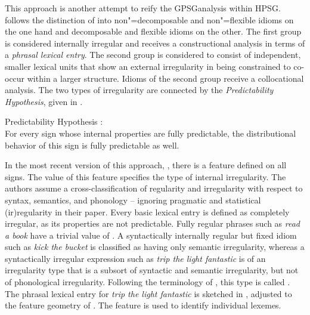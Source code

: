 \documentclass[output=paper,biblatex,babelshorthands,newtxmath,draftmode,colorlinks,citecolor=brown]{langscibook}
\begin{document}
This approach is another attempt to reify the GPSG\indexgpsg analysis
within HPSG.  \citet{Sailer2000a} follows the distinction of \citet{NSW94a} into non"=decomposable
and non"=flexible idioms on the one hand and decomposable and flexible idioms on the other. The
first group is considered internally irregular and receives a constructional analysis in terms of a
\emph{phrasal lexical entry}. The second group is considered to consist of
independent, smaller lexical units that show an external irregularity in being constrained to
co-occur within a larger structure.  Idioms of the second group receive a collocational
analysis. The two types of irregularity are connected by the \emph{Predictability Hypothesis}, given
in .

\vbox{
\eanoraggedright 
\label{PredHypo}
Predictability Hypothesis \citep[]{Sailer2000a}:\\
For every sign whose internal properties are fully predictable, the distributional
behavior of this sign is fully predictable as well.
\z 
}

\noindent
In the most recent version of this approach, \citet{Richter:Sailer:09,Richter:Sailer:14}, there is a
feature  defined on all signs. The value of this feature specifies the type of internal
irregularity.  The authors assume a cross-classification of regularity and irregularity with respect
to syntax, semantics, and phonology -- ignoring pragmatic and statistical (ir)regularity in their
paper.  Every basic lexical entry is defined as completely irregular, as its properties are not
predictable.  Fully regular phrases such as \emph{read a book} have a trivial value of .
A syntactically internally regular but fixed idiom such as \emph{kick the bucket} is classified as
having only semantic irregularity, whereas a syntactically irregular expression such as \emph{trip
  the light fantastic} is of an irregularity type that is a subsort of syntactic and semantic
irregularity, but not of phonological irregularity.  Following the terminology of \citet{FKoC88a},
this type is called .
%
The phrasal lexical entry for \emph{trip the light fantastic} is sketched in ,
adjusted to the feature geometry of \citet{Sag97a}.
The feature  is used to identify individual lexemes.
\end{document}
